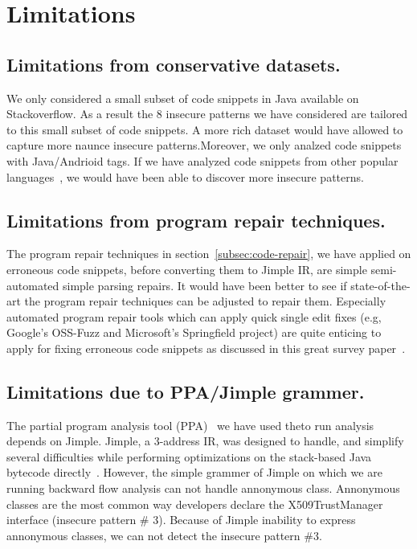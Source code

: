 \section{Limitations}
\label{sec:limitations}
\subsection{Limitations from conservative datasets.} We only considered a small subset of code snippets in Java available on Stackoverflow. 
As a result the 8 insecure patterns we have considered are tailored to this small subset of code snippets. 
A more rich dataset would have allowed to capture more naunce insecure patterns.Moreover, we only analzed code snippets with Java/Andrioid tags.
If we have analyzed code snippets from other popular languages~\cite{stackoverflow-survey}, we would have been able to
discover more insecure patterns.   


\subsection{Limitations from program repair techniques.} The program repair techniques in section~\ref{subsec:code-repair}, 
we have applied on erroneous code snippets, 
before converting them to Jimple IR, are simple semi-automated simple parsing  repairs. It would have been better to see if state-of-the-art  
the program repair techniques can be adjusted to repair them. Especially automated program repair tools which can apply quick single 
edit fixes (e.g, Google's OSS-Fuzz and Microsoft's Springfield project) are quite enticing to apply 
for fixing erroneous code snippets as discussed in this great survey paper~\cite{automated-program-repair}.



\noindent
\label{limitatons:jimple} 
\subsection{Limitations due to PPA/Jimple grammer.} The partial program analysis tool (PPA)~\cite{dagenais2008enabling} we have used theto run 
analysis depends on Jimple.
Jimple, a 3-address IR, was designed to handle, and simplify several
difficulties while performing optimizations on the stack-based Java bytecode directly~\cite{vallee1998jimple}. However, 
the simple grammer of Jimple on which we are running backward flow analysis can not handle annonymous class. 
Annonymous classes are the most common way developers declare the X509TrustManager interface (insecure pattern \# 3). Because of
Jimple inability to express annonymous classes, we can not detect the insecure pattern \#3.

